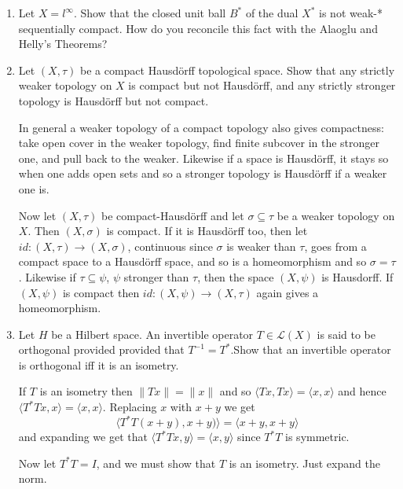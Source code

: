 \documentclass{article}
\begin{document}
\begin{enumerate}
\item Let $X = l^\infty$. Show that the closed unit ball $B^\ast$ of the dual $X^\ast$ is not weak-* sequentially compact. How do you reconcile this fact with the Alaoglu and Helly's Theorems?


\item Let $(X, \tau)$ be a compact Hausd\"orff topological space. Show that any strictly weaker topology on $X$ is compact but not Hausd\"orff, and any strictly stronger topology is Hausd\"orff but not compact.

In general a weaker topology of a compact topology also gives compactness: take open cover in the weaker topology, find finite subcover in the stronger one, and pull back to the weaker. Likewise if a space is Hausd\"orff, it stays so when one adds open sets and so a stronger topology is Hausd\"orff if a weaker one is.

Now let $(X, \tau)$ be compact-Hausd\"orff and let $\sigma \subseteq \tau$ be a weaker topology on $X$. Then $(X, \sigma)$ is compact. If it is Hausd\"orff too, then let $id : (X, \tau) \to (X, \sigma)$, continuous since $\sigma$ is weaker than $\tau$, goes from a compact space to a Hausd\"orff space, and so is a homeomorphism and so $\sigma = \tau$. Likewise if $\tau \subseteq \psi$, $\psi$ stronger than $\tau$, then the space $(X, \psi)$ is Hausdorff. If $(X, \psi)$ is compact then $id : (X, \psi) \to (X, \tau)$ again gives a homeomorphism.


\item Let $H$ be a Hilbert space. An invertible operator $T \in \mathcal{L}(X)$ is said to be orthogonal provided provided that $T^{-1} = T^\ast$.Show that an invertible operator is orthogonal iff it is an isometry.

If $T$ is an isometry then $\|T x\| = \|x\|$ and so $\langle T x, T x \rangle = \langle x, x \rangle$ and hence $\langle T^\ast T x, x \rangle = \langle x, x \rangle$. Replacing $x$ with $x + y$ we get $$\langle T^\ast T (x + y), x + y) \rangle = \langle x + y, x + y \rangle$$ and expanding we get that $\langle T^\ast T x, y \rangle = \langle x, y \rangle$ since $T^\ast T$ is symmetric.

Now let $T^\ast T = I$, and we must show that $T$ is an isometry. Just expand the norm.


\end{enumerate}
\end{document}

